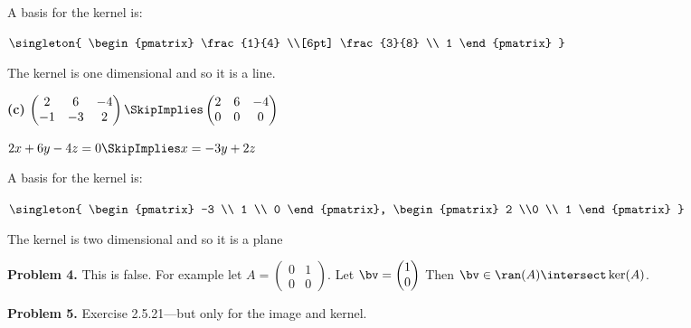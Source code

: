 \documentclass[oneside,12pt]{amsart}
\begin{document}
A basis for the kernel is:

$
\singleton{
\begin{pmatrix}
\frac{1}{4} \\[6pt]
 \frac{3}{8}  \\
 1
\end{pmatrix}
}
$

\bigskip

The kernel is one dimensional and so it is a line.

\bigskip

\textbf{(c)}
\bigskip
$
\begin{pmatrix}
2 & 6 & -4 \\
-1 & -3 & 2
\end{pmatrix}
\SkipImplies
\begin{pmatrix}
2 & 6 & -4 \\
0 & 0 & 0
\end{pmatrix}
$

\bigskip

 $2x + 6y -4z = 0 \SkipImplies x = -3y +2z$

A basis for the kernel is:

$
\singleton{
\begin{pmatrix}
-3 \\ 1 \\ 0
\end{pmatrix},
\begin{pmatrix}
2 \\0 \\ 1
\end{pmatrix}
}
$

\bigskip

The kernel is two dimensional and so it is a plane

\bigskip


\textbf{Problem 4.} This is false. For example let
$
A=
\begin{pmatrix}
0 & 1 \\
0 & 0
\end{pmatrix}
$.
Let $\bv =
\begin{pmatrix}
1 \\ 0
\end{pmatrix}
$
Then $\bv\in\ran(A)\intersect\ker(A)$.

\bigskip


\textbf{Problem 5.} Exercise 2.5.21---but only for the image and kernel.
\end{document}
